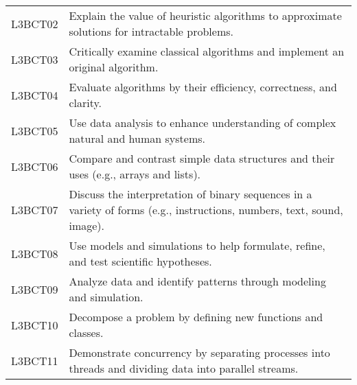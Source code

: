 \begin{longtable}{p{1.8cm}p{11cm}}
 L3BCT02 & Explain the value of heuristic algorithms to approximate solutions for intractable problems.                                                                                                                               \\
 L3BCT03 & Critically examine classical algorithms and implement an original algorithm.                                                                                                                                               \\
 L3BCT04 & Evaluate algorithms by their efficiency, correctness, and clarity.                                                                                                                                                         \\
 L3BCT05 & Use data analysis to enhance understanding of complex natural and human systems.                                                                                                                                           \\
 L3BCT06 & Compare and contrast simple data structures and their uses (e.g., arrays and lists).                                                                                                                                       \\
 L3BCT07 & Discuss the interpretation of binary sequences in a variety of forms (e.g., instructions, numbers, text, sound, image).                                                                                                    \\
 L3BCT08 & Use models and simulations to help formulate, refine, and test scientific hypotheses.                                                                                                                                      \\
 L3BCT09 & Analyze data and identify patterns through modeling and simulation.                                                                                                                                                        \\
 L3BCT10 & Decompose a problem by defining new functions and classes.                                                                                                                                                                 \\
 L3BCT11 & Demonstrate concurrency by separating processes into threads and dividing data into parallel streams.
\end{longtable}